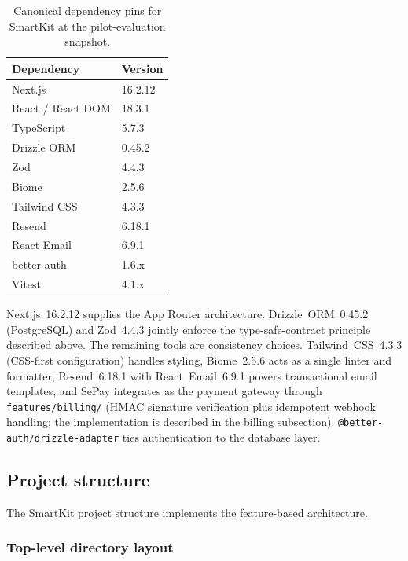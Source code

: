 \documentclass[12pt,a4paper]{report}
\newcommand{\pkg}[1]{\texttt{\nolinkurl{#1}}}
\DeclareRobustCommand{\filename}[1]{\bgroup\urlstyle{tt}\nolinkurl{#1}\egroup}
\begin{document}
\begin{table}[H]
  \centering
  \small
  \caption{Canonical dependency pins for SmartKit at the pilot-evaluation snapshot.}
  \label{tbl:dependency-pins}
  \begin{tabular}{ll}
    \hline
    \textbf{Dependency} & \textbf{Version} \\
    \hline
    Next.js & 16.2.12 \\
    React / React DOM & 18.3.1 \\
    TypeScript & 5.7.3 \\
    Drizzle ORM & 0.45.2 \\
    Zod & 4.4.3 \\
    Biome & 2.5.6 \\
    Tailwind CSS & 4.3.3 \\
    Resend & 6.18.1 \\
    React Email & 6.9.1 \\
    better-auth & 1.6.x \\
    Vitest & 4.1.x \\
    \hline
  \end{tabular}
\end{table}

Next.js~16.2.12 supplies the App Router architecture. Drizzle~ORM~0.45.2 (PostgreSQL) and Zod~4.4.3 jointly enforce the type-safe-contract principle described above. The remaining tools are consistency choices. Tailwind~CSS~4.3.3 (CSS-first configuration) handles styling, Biome~2.5.6 acts as a single linter and formatter, Resend~6.18.1 with React~Email~6.9.1 powers transactional email templates, and SePay integrates as the payment gateway through \filename{features/billing/} (HMAC signature verification plus idempotent webhook handling; the implementation is described in the billing subsection). \pkg{@better-auth/drizzle-adapter} ties authentication to the database layer.

\subsection{Project structure}
\label{sec:project-structure}

The SmartKit project structure implements the feature-based architecture.

\subsubsection{Top-level directory layout}
\label{sec:top-level-layout}
\end{document}
